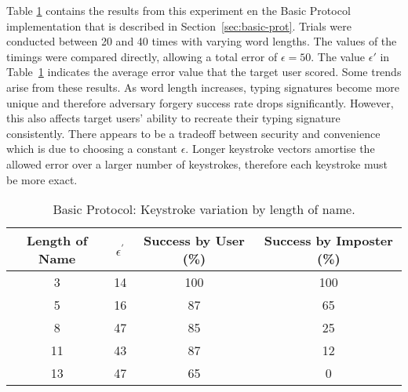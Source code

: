 \documentclass[11pt]{article}
\begin{document}
Table \ref{table:res-basic} contains the results from this experiment en the Basic Protocol implementation that is described in Section~\ref{sec:basic-prot}. Trials were conducted between 20 and 40 times with varying word lengths. The values of the timings were compared directly, allowing a total error of $\epsilon=50$. The value $\epsilon'$ in Table~\ref{table:res-basic} indicates the average error value that the target user scored. Some trends arise from these results. As word length increases, typing signatures become more unique and therefore adversary forgery success rate drops significantly. However, this also affects target users' ability to recreate their typing signature consistently. There appears to be a tradeoff between security and convenience which is due to choosing a constant $\epsilon$. Longer keystroke vectors amortise the allowed error over a larger number of keystrokes, therefore each keystroke must be more exact.

\begin{table}[h!]
\centering
\begin{tabular}{|c c c c|} 
 \hline
 Length of Name & $\epsilon^{'}$ & Success by User (\%) & Success by Imposter (\%) \\ [0.5ex] 
 \hline\hline
 3 & 14 & 100 & 100 \\ 
 5 & 16 & 87 & 65 \\
 8 & 47 & 85 & 25 \\ 
 11 & 43 & 87 & 12 \\
 13 & 47 & 65 & 0 \\ [1ex] 
 \hline
\end{tabular}
\caption{Basic Protocol: Keystroke variation by length of name.}
\label{table:res-basic}
\end{table}
\end{document}
